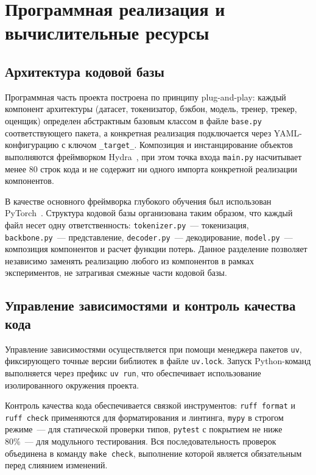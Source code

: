 \section{Программная реализация и вычислительные ресурсы}

\subsection{Архитектура кодовой базы}

Программная часть проекта построена по принципу plug-and-play: каждый
компонент архитектуры (датасет, токенизатор, бэкбон, модель, тренер,
трекер, оценщик) определен абстрактным базовым классом в файле
\texttt{base.py} соответствующего пакета, а конкретная реализация
подключается через YAML-конфигурацию с ключом \texttt{\_target\_}.
Композиция и инстанцирование объектов выполняются фреймворком
Hydra~\cite{yadanHydraConfigFramework2019}, при этом точка входа
\texttt{main.py} насчитывает менее 80 строк кода и не содержит ни
одного импорта конкретной реализации компонентов.

В качестве основного фреймворка глубокого обучения был использован
PyTorch~\cite{paszke2019pytorchimperativestylehighperformance}.
Структура кодовой базы организована таким образом, что каждый файл
несет одну ответственность: \texttt{tokenizer.py}~--- токенизация,
\texttt{backbone.py}~--- представление, \texttt{decoder.py}~---
декодирование, \texttt{model.py}~--- композиция компонентов и расчет
функции потерь. Данное разделение позволяет независимо заменять
реализацию любого из компонентов в рамках экспериментов, не затрагивая
смежные части кодовой базы.

\subsection{Управление зависимостями и контроль качества кода}

Управление зависимостями осуществляется при помощи менеджера пакетов
\texttt{uv}, фиксирующего точные версии библиотек в файле
\texttt{uv.lock}. Запуск Python-команд выполняется через префикс
\texttt{uv run}, что обеспечивает использование изолированного
окружения проекта.

Контроль качества кода обеспечивается связкой инструментов:
\texttt{ruff format} и \texttt{ruff check} применяются для
форматирования и линтинга, \texttt{mypy} в строгом режиме~--- для
статической проверки типов, \texttt{pytest} с покрытием не ниже 80\%~---
для модульного тестирования. Вся последовательность проверок
объединена в команду \texttt{make check}, выполнение которой является
обязательным перед слиянием изменений.

